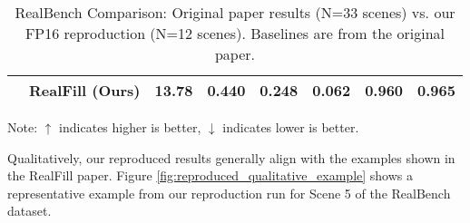 \documentclass{article}
\begin{document}
\begin{table}[H]
\begin{tabular}{@{} l l S[table-format=2.2, round-precision=2] S[table-format=1.3] S[table-format=1.3] S[table-format=1.3] S[table-format=1.3] S[table-format=1.3] @{}}
                                               & \bfseries RealFill (Ours) & \textbf{13.78}                         & \textbf{0.440}                         & \textbf{0.248}                          & \textbf{0.062}   & \textbf{0.960}   & \textbf{0.965} \\
        \bottomrule
    \end{tabular}
    \caption{RealBench Comparison: Original paper results (N=33 scenes) vs. our FP16 reproduction (N=12 scenes). Baselines are from the original paper.}
    \label{tab:reproduced_realbench_comparison}
    {\footnotesize Note: $\uparrow$ indicates higher is better, $\downarrow$ indicates lower is better.}
\end{table}

Qualitatively, our reproduced results generally align with the examples shown in the RealFill paper. Figure \ref{fig:reproduced_qualitative_example} shows a representative example from our reproduction run for Scene 5 of the RealBench dataset.
\end{document}
